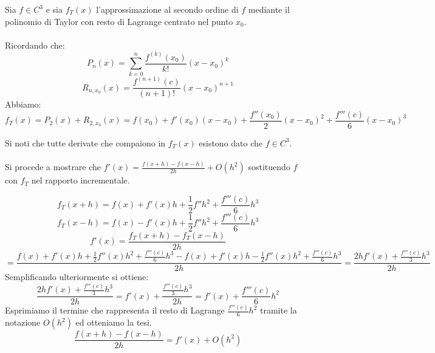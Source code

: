 Sia \(f \in C^3\) e sia \(f_T(x)\) l'approssimazione al secondo ordine di \(f\) mediante il polinomio di Taylor con resto di Lagrange centrato nel punto \(x_0\).
\\
\\
\noindent Ricordando che:
\[
P_n(x) = \sum_{k=0}^n{ \frac{f^{(k)} (x_0)}{k!}(x-x_0)^k}
\]
\[
R_{n,x_0}(x) = \frac{f^{(n+1)}(c)}{(n+1)!}(x-x_0)^{n+1}
\]
\noindent Abbiamo:
\[
f_T(x) = P_2(x) + R_{2, x_0}(x) = f(x_0) + f'(x_0)(x-x_0) + \frac{f''(x_0)}{2}(x-x_0)^2 + \frac{f'''(c)}{6}(x-x_0)^3
\]

\noindent Si noti che tutte derivate che compaiono in \(f_T(x)\) esistono dato che \(f \in C^3\).
\\
\\
\noindent Si procede a mostrare che \(f'(x) = \frac{f(x+h)-f(x-h)}{2h} + O(h^2)\) sostituendo \(f\) con \(f_T\) nel rapporto incrementale.

\[
f_T(x + h) = f(x) + f'(x)h + \frac{1}{2} f''h^2 + \frac{f'''(c)}{6}h^3
\]
\[
f_T(x - h) = f(x) - f'(x)h + \frac{1}{2} f''h^2 + \frac{f'''(c)}{6}h^3
\]
\[
f'(x) = \frac{f_T(x + h) - f_T(x - h)}{2h}
\]
\[
= \frac{
	f(x) + f'(x)h + \frac{1}{2} f''(x)h^2 + \frac{f'''(c)}{6}h^3
	-
	f(x) + f'(x)h - \frac{1}{2} f''(x)h^2 + \frac{f'''(c)}{6}h^3
}{2h} = \frac{2hf'(x) + \frac{f'''(c)}{3}h^3}{2h}
\]
\noindent Semplificando ulteriormente si ottiene:
\[
\frac{2hf'(x) + \frac{f'''(c)}{3}h^3}{2h} = f'(x) + \frac{\frac{f'''(c)}{3}h^3}{2h}= f'(x) + \frac{f'''(c)}{6}h^2
\]
\noindent Esprimiamo il termine che rappresenta il resto di Lagrange \(\frac{f'''(c)}{6}h^2\) tramite la notazione \(O(h^2)\) ed otteniamo la tesi.
\[
\frac{f(x+h)-f(x-h)}{2h} = f'(x) + O(h^2)
\]
